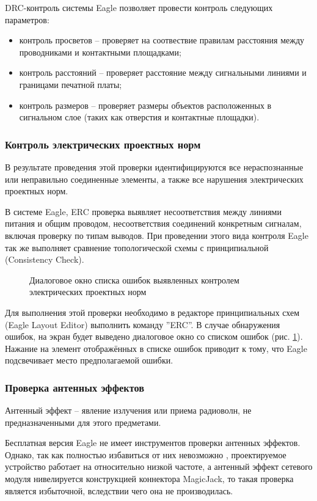 DRC-контроль системы Eagle позволяет провести контроль следующих параметров:
\begin{itemize}
	\item{} контроль просветов -- проверяет на соотвествие правилам расстояния между
		проводниками и контактными площадками;
	\item{} контроль расстояний -- проверяет расстояние между сигнальными
		линиями и границами печатной платы;
	\item{} контроль размеров -- проверяет размеры объектов расположенных в сигнальном
		слое (таких как отверстия и контактные площадки).
\end{itemize}

\subsubsection{Контроль электрических проектных норм}
В результате проведения этой проверки идентифицируются все нераспознанные или
неправильно соединенные элементы, а также все нарушения электрических проектных норм.

В системе Eagle, ERC проверка выявляет несоответствия между линиями питания и общим проводом,
несоответствия соединений конкретным сигналам, включая проверку по типам выводов.
При проведении этого вида контроля Eagle так же выполняет сравнение топологической схемы
с принципиальной (Consistency Check).

\begin{figure}[h]
	\caption{Диалоговое окно списка ошибок выявленных контролем электрических проектных норм}
	\label{img:erc}
\end{figure}

Для выполнения этой проверки необходимо в редакторе принципиальных схем (Eagle Layout Editor)
выполнить команду ''ERC''. В случае обнаружения ошибок, на экран будет выведено диалоговое окно
со списком ошибок (рис. \ref{img:erc}). Нажание на элемент отображённых в списке ошибок приводит
к тому, что Eagle подсвечивает место предполагаемой ошибки.


\subsubsection{Проверка антенных эффектов}
Антенный эффект --  явление излучения или приема радиоволн, не предназначенными для этого
предметами.

Бесплатная версия Eagle не имеет инструментов проверки антенных эффектов. Однако, так как
полностью избавиться от них невозможно \cite{antennaeff}, проектируемое устройство работает
на относительно низкой частоте, а антенный эффект сетевого модуля нивелируется конструкцией
коннектора MagicJack, то такая проверка является избыточной, вследствии чего
она не производилась.

